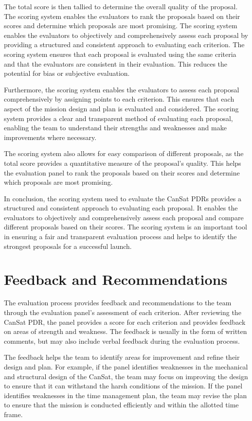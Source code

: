 \documentclass[11pt]{article}
\begin{document}
The total score is then tallied to determine the overall quality of the proposal. The scoring system enables the evaluators to rank the proposals based on their scores and determine which proposals are most promising.
The scoring system enables the evaluators to objectively and comprehensively assess each proposal by providing a structured and consistent approach to evaluating each criterion. The scoring system ensures that each proposal is evaluated using the same criteria and that the evaluators are consistent in their evaluation. This reduces the potential for bias or subjective evaluation.

Furthermore, the scoring system enables the evaluators to assess each proposal comprehensively by assigning points to each criterion. This ensures that each aspect of the mission design and plan is evaluated and considered. The scoring system provides a clear and transparent method of evaluating each proposal, enabling the team to understand their strengths and weaknesses and make improvements where necessary.

The scoring system also allows for easy comparison of different proposals, as the total score provides a quantitative measure of the proposal's quality. This helps the evaluation panel to rank the proposals based on their scores and determine which proposals are most promising.

In conclusion, the scoring system used to evaluate the CanSat PDRs provides a structured and consistent approach to evaluating each proposal. It enables the evaluators to objectively and comprehensively assess each proposal and compare different proposals based on their scores. The scoring system is an important tool in ensuring a fair and transparent evaluation process and helps to identify the strongest proposals for a successful launch.

\section{Feedback and Recommendations}
The evaluation process provides feedback and recommendations to the team through the evaluation panel's assessment of each criterion. After reviewing the CanSat PDR, the panel provides a score for each criterion and provides feedback on areas of strength and weakness. The feedback is usually in the form of written comments, but may also include verbal feedback during the evaluation process.

The feedback helps the team to identify areas for improvement and refine their design and plan. For example, if the panel identifies weaknesses in the mechanical and structural design of the CanSat, the team may focus on improving the design to ensure that it can withstand the harsh conditions of the mission. If the panel identifies weaknesses in the time management plan, the team may revise the plan to ensure that the mission is conducted efficiently and within the allotted time frame.
\end{document}
